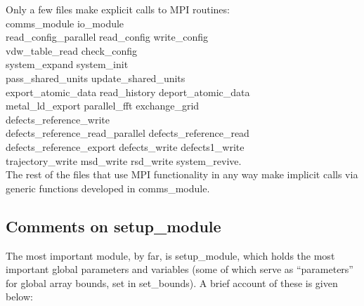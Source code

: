 Only a few files make explicit calls to MPI routines: \\
{\sc
comms\_module io\_module \\
read\_config\_parallel read\_config write\_config \\
vdw\_table\_read check\_config \\
system\_expand system\_init \\
pass\_shared\_units update\_shared\_units \\
export\_atomic\_data read\_history deport\_atomic\_data \\
metal\_ld\_export parallel\_fft exchange\_grid \\
defects\_reference\_write \\
defects\_reference\_read\_parallel defects\_reference\_read \\
defects\_reference\_export defects\_write defects1\_write \\
trajectory\_write msd\_write rsd\_write system\_revive}. \\
The rest of the files that use MPI functionality in any way make
implicit calls via generic functions developed in {\sc comms\_module}.

\subsection{Comments on {\sc setup\_module}}
\label{parameters}

The most important module, by far, is {\sc setup\_module}, which
holds the most important global parameters and variables (some of
which serve as ``parameters'' for global array bounds, set in {\sc
set\_bounds}). A brief account of these is given below:

